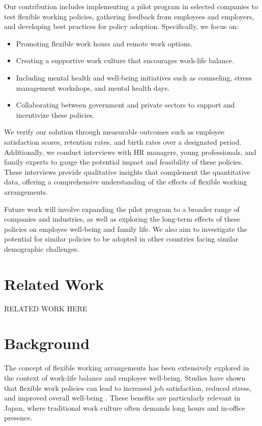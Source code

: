 \documentclass{article} %
\begin{document}
Our contribution includes implementing a pilot program in selected companies to test flexible working policies, gathering feedback from employees and employers, and developing best practices for policy adoption. Specifically, we focus on:
\begin{itemize}
    \item Promoting flexible work hours and remote work options.
    \item Creating a supportive work culture that encourages work-life balance.
    \item Including mental health and well-being initiatives such as counseling, stress management workshops, and mental health days.
    \item Collaborating between government and private sectors to support and incentivize these policies.
\end{itemize}

We verify our solution through measurable outcomes such as employee satisfaction scores, retention rates, and birth rates over a designated period. Additionally, we conduct interviews with HR managers, young professionals, and family experts to gauge the potential impact and feasibility of these policies. These interviews provide qualitative insights that complement the quantitative data, offering a comprehensive understanding of the effects of flexible working arrangements.

Future work will involve expanding the pilot program to a broader range of companies and industries, as well as exploring the long-term effects of these policies on employee well-being and family life. We also aim to investigate the potential for similar policies to be adopted in other countries facing similar demographic challenges.

\section{Related Work}
\label{sec:related}
RELATED WORK HERE

\section{Background}
\label{sec:background}
The concept of flexible working arrangements has been extensively explored in the context of work-life balance and employee well-being. Studies have shown that flexible work policies can lead to increased job satisfaction, reduced stress, and improved overall well-being \citep{park2023generative, shanahan2023role}. These benefits are particularly relevant in Japan, where traditional work culture often demands long hours and in-office presence.
\end{document}
